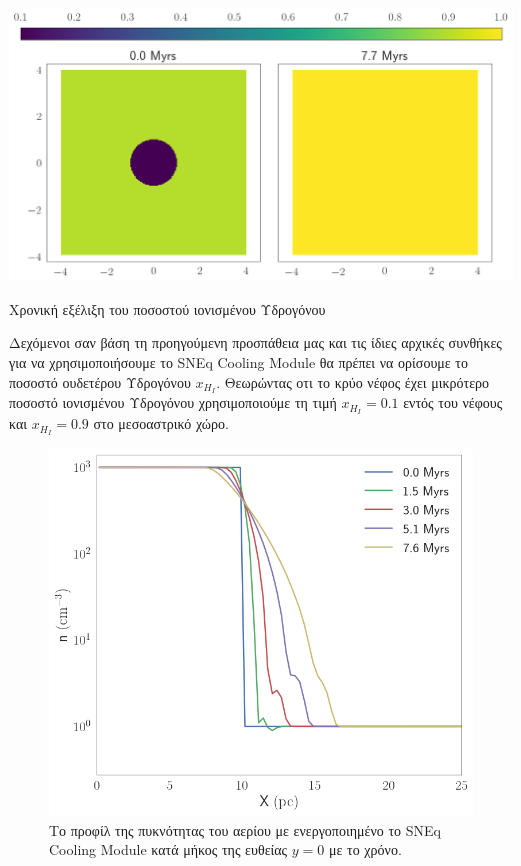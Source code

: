 \documentclass[article,a4paper,11.2pt]{memoir}
\numberwithin{equation}{subsection}
\begin{document}
	\begin{marginfigure}
		\includegraphics[width=1\linewidth]{DataImages/SNCoolingXHIquad}
		\caption{Χρονική εξέλιξη του ποσοστού ιονισμένου Υδρογόνου}
		\label{fig:sncoolingxhiquad}
	\end{marginfigure}
	
	
	Δεχόμενοι σαν βάση τη προηγούμενη προσπάθεια μας και τις ίδιες αρχικές συνθήκες για να χρησιμοποιήσουμε το SNEq Cooling Module θα πρέπει να ορίσουμε το ποσοστό ουδετέρου Υδρογόνου $x_{H_I}$.
	Θεωρώντας οτι το κρύο νέφος έχει μικρότερο ποσοστό ιονισμένου Υδρογόνου χρησιμοποιούμε τη τιμή $x_{H_I}=0.1$ εντός του νέφους και $x_{H_I}=0.9$ 
	στο μεσοαστρικό χώρο.
	
\begin{figure}[h]
	\begin{adjustwidth}{-5cm}{-0cm}
	\includegraphics[width=1\linewidth]{DataImages/SNCoolingRHOprofile}
	\caption{Το προφίλ της πυκνότητας του αερίου με ενεργοποιημένο το SNEq Cooling Module κατά μήκος της ευθείας $y=0$ με το χρόνο.}
	\label{fig:sncoolingrhoprofile}
\end{adjustwidth}
\end{figure}
\end{document}

